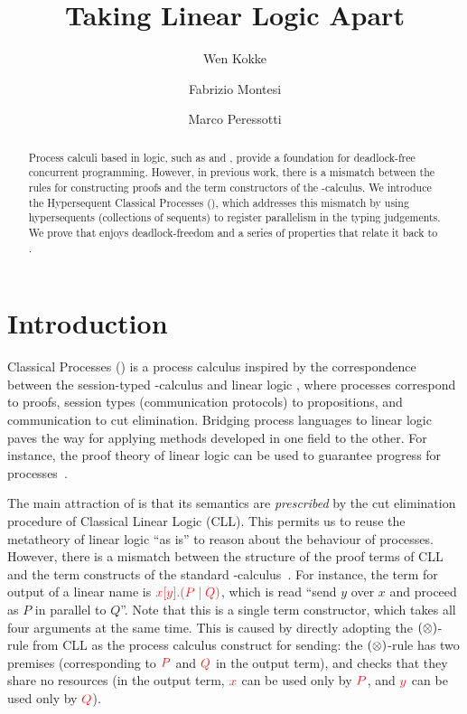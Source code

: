 \documentclass[draft,submission,copyright,creativecommons]{eptcs}
\title{Taking Linear Logic Apart}
\author{%
  Wen Kokke
  \institute{University of Edinburgh\\ Edinburgh, Scotland}
  \email{wen.kokke@ed.ac.uk}
  \and
  Fabrizio Montesi
  \institute{University of Southern Denmark\\ Odense, Denmark}
  \email{fmontesi@imada.sdu.dk}
  \and
  Marco Peressotti
  \institute{University of Southern Denmark\\ Odense, Denmark}
  \email{peressotti@imada.sdu.dk}}
\begin{document}
\maketitle

\begin{abstract}
  Process calculi based in logic, such as \piDILL and \cp, provide a foundation
  for deadlock-free concurrent programming. However, in previous work, there is a mismatch between the rules for constructing proofs and the term constructors of the \textpi-calculus. We introduce the Hypersequent Classical Processes (\hcp), which addresses this mismatch by using hypersequents (collections of sequents) to register parallelism in the typing judgements.
	We prove that \hcp enjoys deadlock-freedom and a series of properties that relate it back to \cp.
\end{abstract}

\section{Introduction}
\label{sec:introduction}

Classical Processes (\cp) \citep{wadler2012} is a process calculus inspired by the correspondence between the session-typed \textpi-calculus and linear logic \citep{caires2010}, where processes correspond to proofs, session types (communication protocols) to propositions, and communication to cut elimination. Bridging process languages to linear logic paves the way for applying methods developed in one field to the other. For instance, the proof theory of linear logic can be used to guarantee progress for processes~\citep{caires2010,wadler2012}.

The main attraction of \cp is that its semantics are \emph{prescribed} by the cut elimination procedure of Classical Linear Logic (CLL). This permits us to reuse the metatheory of linear logic ``as is'' to reason about the behaviour of processes. However, there is a mismatch between the structure of the proof terms of CLL and the term constructs of the standard \textpi-calculus~\citep{milner1992a,milner1992b}. For instance, the term for output of a linear name is $\tm{\cpSend{x}{y}{P}{Q}}$, which is read ``send $y$ over $x$ and proceed as $P$ in parallel to $Q$''. Note that this is a single term constructor, which takes all four arguments at the same time. This is caused by directly adopting the $(\otimes)$-rule from CLL as the process calculus construct for sending: the $(\otimes)$-rule has two premises (corresponding to $\tm P$ and $\tm Q$ in the output term), and checks that they share no resources (in the output term, $\tm x$ can be used only by $\tm P$, and $\tm y$ can be used only by $\tm Q$).
\end{document}

